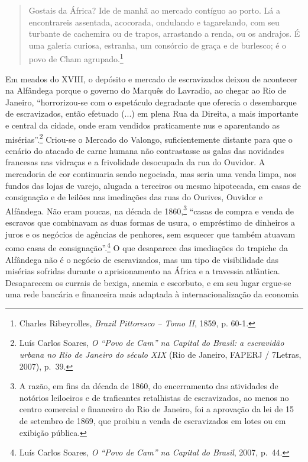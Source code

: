 \begin{quote}
Gostais da África? Ide de manhã ao mercado contíguo ao porto. Lá a
encontrareis assentada, acocorada, ondulando e tagarelando, com seu
turbante de cachemira ou de trapos, arrastando a renda, ou os andrajos.
É uma galeria curiosa, estranha, um consórcio de graça e de burlesco; é
o povo de Cham agrupado.\footnote{Charles Ribeyrolles, \emph{Brazil
  Pittoresco -- Tomo II}, 1859, p. 60-1.}
\end{quote}

Em meados do XVIII, o depósito e mercado de escravizados deixou de
acontecer na Alfândega porque o governo do Marquês do Lavradio, ao
chegar ao Rio de Janeiro, ``horrorizou-se com o espetáculo degradante
que oferecia o desembarque de escravizados, então efetuado (...) em
plena Rua da Direita, a mais importante e central da cidade, onde eram
vendidos praticamente nus e aparentando as misérias''.\footnote{Luís
  Carlos Soares, \emph{O ``Povo de Cam'' na Capital do Brasil: a
  escravidão urbana no Rio de Janeiro do século XIX} (Rio de Janeiro,
  FAPERJ / 7Letras, 2007), p.~39.} Criou-se o Mercado do Valongo,
suficientemente distante para que o cenário do atacado de carne humana
não contrastasse as galas das novidades francesas nas vidraças e a
frivolidade desocupada da rua do Ouvidor. A mercadoria de cor
continuaria sendo negociada, mas seria uma venda limpa, nos fundos das
lojas de varejo, alugada a terceiros ou mesmo hipotecada, em casas de
consignação e de leilões nas imediações das ruas do Ourives, Ouvidor e
Alfândega. Não eram poucas, na década de 1860,\footnote{A razão, em fins
  da década de 1860, do encerramento das atividades de notórios
  leiloeiros e de traficantes retalhistas de escravizados, ao menos no
  centro comercial e financeiro do Rio de Janeiro, foi a aprovação da
  lei de 15 de setembro de 1869, que proibiu a venda de escravizados em
  lotes ou em exibição pública.} ``casas de compra e venda de escravos
que combinavam as duas formas de usura, o empréstimo de dinheiros a
juros e os negócios de agências de penhores, sem esquecer que também
atuavam como casas de consignação''.\footnote{Luís Carlos Soares,
  \emph{O ``Povo de Cam'' na Capital do Brasil}, 2007, p.~44.} O que
desaparece das imediações do trapiche da Alfândega não é o negócio de
escravizados, mas um tipo de visibilidade das misérias sofridas durante
o aprisionamento na África e a travessia atlântica. Desaparecem os
currais de bexiga, anemia e escorbuto, e em seu lugar ergue-se uma rede
bancária e financeira mais adaptada à internacionalização da economia
